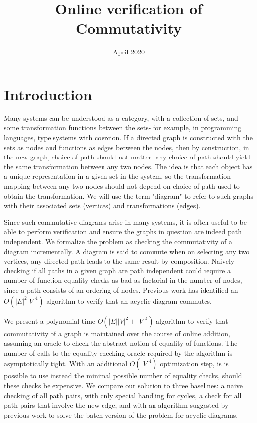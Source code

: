 \documentclass{article}
\title{Online verification of Commutativity}
\author{ }
\date{April 2020}
\begin{document}
\maketitle

\section{Introduction}

Many systems can be understood as a category, with a collection of sets, and some transformation functions between the sets- for example, in programming languages, type systems with coercion. If a directed graph is constructed with the sets as nodes and functions as edges between the nodes, then by construction, in the new graph, choice of path should not matter- any choice of path should yield the same transformation between any two nodes. The idea is that each object has a unique representation in a given set in the system, so the transformation mapping between any two nodes should not depend on choice of path used to obtain the transformation. We will use the term "diagram" to refer to such graphs with their associated sets (vertices) and transformations (edges).

Since such commutative diagrams arise in many systems, it is often useful to be able to perform verification and ensure the graphs in question are indeed path independent. 
We formalize the problem as checking the commutativity of a diagram incrementally.
A diagram is said to commute when on selecting any two vertices, any directed path leads to the same result by composition.
Naively checking if all paths in a given graph are path independent could require a number of function equality checks as bad as factorial in the number of nodes, since a path consists of an ordering of nodes. Previous work has identified an $O(|E|^2|V|^4)$ algorithm to verify that an acyclic diagram commutes.

We present a polynomial time $O(|E||V|^2+|V|^3)$ algorithm to verify that commutativity of a graph is maintained over the course of online addition, assuming an oracle to check the abstract notion of equality of functions. The number of calls to the equality checking oracle required by the algorithm is asymptotically tight. With an additional $O(|V|^4)$ optimization step, is is possible to use instead the minimal possible number of equality checks, should these checks be expensive. We compare our solution to three baselines: a naive checking of all path pairs, with only special handling for cycles, a check for all path pairs that involve the new edge, and with an algorithm suggested by previous work to solve the batch version of the problem for acyclic diagrams.
\end{document}
